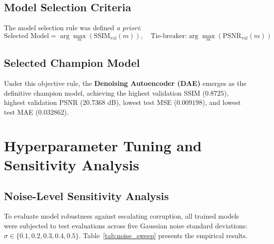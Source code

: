 \documentclass[12pt, a4paper]{article}
\begin{document}
\subsection{Model Selection Criteria}
The model selection rule was defined \textit{a priori}:
\begin{equation}
    \text{Selected Model} = \arg\max_{m} \left( \text{SSIM}_{\text{val}}(m) \right), \quad \text{Tie-breaker:} \arg\max_m \left( \text{PSNR}_{\text{val}}(m) \right)
\end{equation}

\subsection{Selected Champion Model}
Under this objective rule, the \textbf{Denoising Autoencoder (DAE)} emerges as the definitive champion model, achieving the highest validation SSIM ($0.8725$), highest validation PSNR ($20.7368$ dB), lowest test MSE ($0.009198$), and lowest test MAE ($0.032862$).


\section{Hyperparameter Tuning and Sensitivity Analysis}

\subsection{Noise-Level Sensitivity Analysis}
To evaluate model robustness against escalating corruption, all trained models were subjected to test evaluations across five Gaussian noise standard deviations: $\sigma \in \{0.1, 0.2, 0.3, 0.4, 0.5\}$. Table~\ref{tab:noise_sweep} presents the empirical results.
\end{document}
